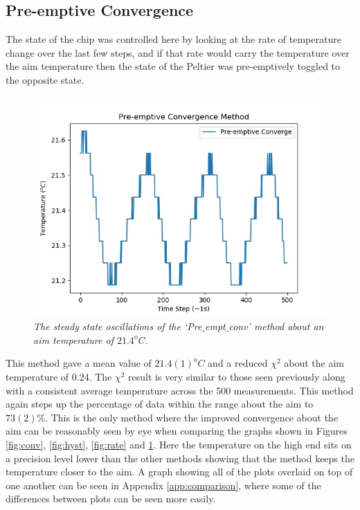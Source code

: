 \documentclass[10pt]{article}
\begin{document}
\subsection*{Pre-emptive Convergence}
The state of the chip was controlled here by looking at the rate of temperature change over the last few steps, and if that rate would carry the temperature over the aim temperature then the state of the Peltier was pre-emptively toggled to the opposite state.\\

\begin{figure}[h!]
    \centering
    \includegraphics[scale=0.75]{pre_emp.jpg}
    \caption{\it{The steady state oscillations of the `Pre$\_$empt$\_$conv' method about an aim temperature of $21.4^oC$.}}
    \label{fig:pre}
\end{figure}

This method gave a mean value of $21.4(1)^oC$ and a reduced $\chi^2$ about the aim temperature of 0.24. The $\chi^2$ result is very similar to those seen previously along with a consistent average temperature across the 500 measurements. This method again steps up the percentage of data within the range about the aim to $73(2)\%$. This is the only method where the improved convergence about the aim can be reasonably seen by eye when comparing the graphs shown in Figures \ref{fig:conv}, \ref{fig:hyst}, \ref{fig:rate} and \ref{fig:pre}. Here the temperature on the high end sits on a precision level lower than the other methods showing that the method keeps the temperature closer to the aim. A graph showing all of the plots overlaid on top of one another can be seen in Appendix \ref{app:comparison}, where some of the differences between plots can be seen more easily.\\
\end{document}
